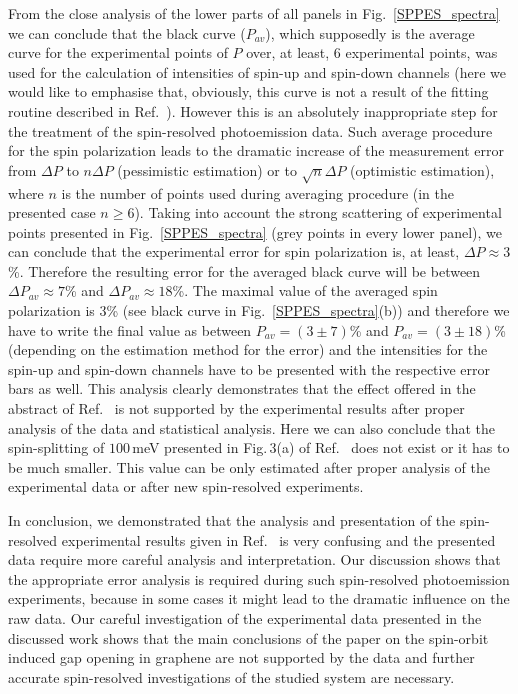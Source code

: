 \documentclass[twocolumn,preprintnumbers,amsmath,amssymb,prl]{revtex4}
\begin{document}
From the close analysis of the lower parts of all panels in Fig.~\ref{SPPES_spectra} we can conclude that the black curve ($P_{av}$), which supposedly is the average curve for the experimental points of $P$ over, at least, 6 experimental points, was used for the calculation of intensities of spin-up and spin-down channels (here we would like to emphasise that, obviously, this curve is not a result of the fitting routine described in Ref.~). However this is an absolutely inappropriate step for the treatment of the spin-resolved photoemission data. Such average procedure for the spin polarization leads to the dramatic increase of the measurement error from $\Delta P$ to $n\Delta P$ (pessimistic estimation) or to $\sqrt{n}\Delta P$ (optimistic estimation), where $n$ is the number of points used during averaging procedure (in the presented case $n\geq6$). Taking into account the strong scattering of experimental points presented in Fig.~\ref{SPPES_spectra} (grey points in every lower panel), we can conclude that the experimental error for spin polarization is, at least, $\Delta P\approx3$\%. Therefore the resulting error for the averaged black curve will be between $\Delta P_{av}\approx7$\% and $\Delta P_{av}\approx18$\%. The maximal value of the averaged spin polarization is $3$\% (see black curve in Fig.~\ref{SPPES_spectra}(b)) and therefore we have to write the final value as between $P_{av}=(3\pm7)$\% and $P_{av}=(3\pm18)$\% (depending on the estimation method for the error) and the intensities for the spin-up and spin-down channels have to be presented with the respective error bars as well. This analysis clearly demonstrates that the effect offered in the abstract of Ref.~ is not supported by the experimental results after proper analysis of the data and statistical analysis. Here we can also conclude that the spin-splitting of $100$\,meV presented in Fig.\,3(a) of Ref.~ does not exist or it has to be much smaller. This value can be only estimated after proper analysis of the experimental data or after new spin-resolved experiments.

In conclusion, we demonstrated that the analysis and presentation of the spin-resolved experimental results given in Ref.~ is very confusing and the presented data require more careful analysis and interpretation. Our discussion shows that the appropriate error analysis is required during such spin-resolved photoemission experiments, because in some cases it might lead to the dramatic influence on the raw data. Our careful investigation of the experimental data presented in the discussed work shows that the main conclusions of the paper on the spin-orbit induced gap opening in graphene are not supported by the data and further accurate spin-resolved investigations of the studied system are necessary.
\end{document}
